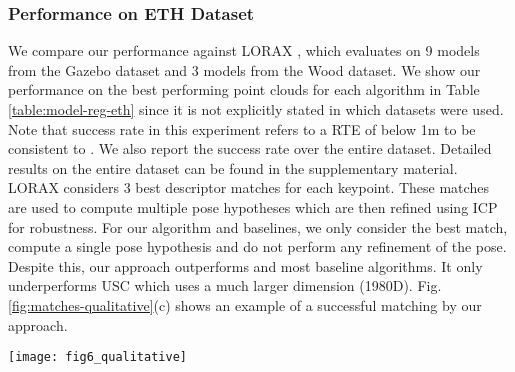 \documentclass[runningheads]{llncs}
\begin{document}
\subsubsection{Performance on ETH Dataset}
We compare our performance against LORAX \cite{Elbaz2017CVPR}, which evaluates on 9 models from the Gazebo dataset and 3 models from the Wood dataset. We show our performance on the best performing point clouds for each algorithm in Table \ref{table:model-reg-eth} since it is not explicitly stated in \cite{Elbaz2017CVPR} which datasets were used. Note that success rate in this experiment refers to a RTE of below 1m to be consistent to \cite{Elbaz2017CVPR}. We also report the success rate over the entire dataset. Detailed results on the entire dataset can be found in the supplementary material.
LORAX considers 3 best descriptor matches for each keypoint. These matches are used to compute multiple pose hypotheses which are then refined using ICP for robustness. For our algorithm and baselines, we only consider the best match, compute a single pose hypothesis and do not perform any refinement of the pose. Despite this, our approach outperforms \cite{Elbaz2017CVPR} and most baseline algorithms. It only underperforms USC which uses a much larger dimension (1980D).
Fig. \ref{fig:matches-qualitative}(c) shows an example of a successful matching by our approach.

\begin{figure*}[t]
    \centering
    \texttt{[image: fig6\_qualitative]}
    \caption{Qualitative registration results, using our approach (left) and ISS + FPFH (right). We only show a random subset of matches retained after RANSAC, and exclude the ground in (c) for clarity. We also show the results using ISS + FPFH.}
    \label{fig:matches-qualitative}
\end{figure*}
\end{document}
